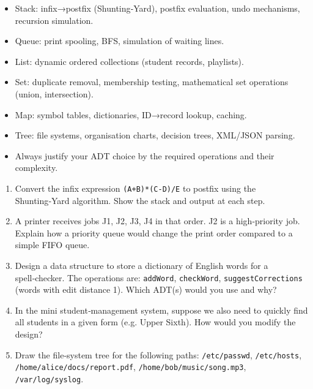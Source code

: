 \documentclass[11pt]{article}
\begin{document}
\begin{aretenir}
\begin{itemize}
\item Stack: infix→postfix (Shunting‑Yard), postfix evaluation, undo mechanisms, recursion simulation.
\item Queue: print spooling, BFS, simulation of waiting lines.
\item List: dynamic ordered collections (student records, playlists).
\item Set: duplicate removal, membership testing, mathematical set operations (union, intersection).
\item Map: symbol tables, dictionaries, ID→record lookup, caching.
\item Tree: file systems, organisation charts, decision trees, XML/JSON parsing.
\item Always justify your ADT choice by the required operations and their complexity.
\end{itemize}
\end{aretenir}

\begin{exercice}
\begin{enumerate}
\item Convert the infix expression \texttt{(A+B)*(C-D)/E} to postfix using the Shunting‑Yard algorithm. Show the stack and output at each step.
\item A printer receives jobs J1, J2, J3, J4 in that order. J2 is a high‑priority job. Explain how a priority queue would change the print order compared to a simple FIFO queue.
\item Design a data structure to store a dictionary of English words for a spell‑checker. The operations are: \texttt{addWord}, \texttt{checkWord}, \texttt{suggestCorrections} (words with edit distance 1). Which ADT(s) would you use and why?
\item In the mini student‑management system, suppose we also need to quickly find all students in a given form (e.g. Upper Sixth). How would you modify the design?
\item Draw the file‑system tree for the following paths:
  \texttt{/etc/passwd}, \texttt{/etc/hosts}, \texttt{/home/alice/docs/report.pdf}, \texttt{/home/bob/music/song.mp3}, \texttt{/var/log/syslog}.
\end{enumerate}
\end{exercice}
\end{document}
